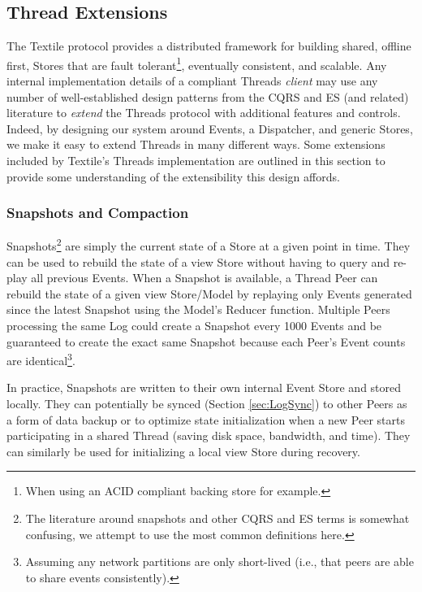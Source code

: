 \documentclass{textile}
\begin{document}
\subsection{Thread Extensions}

The Textile protocol provides a distributed framework for building shared, offline first, Stores that are fault tolerant\footnote{When using an ACID compliant backing store for example.}, eventually consistent, and scalable. Any internal implementation details of a compliant Threads \emph{client} may use any number of well-established design patterns from the CQRS and ES (and related) literature to \emph{extend} the Threads protocol with additional features and controls. Indeed, by designing our system around Events, a Dispatcher, and generic Stores, we make it easy to extend Threads in many different ways. Some extensions included by Textile's Threads implementation are outlined in this section to provide some understanding of the extensibility this design affords.

\subsubsection{Snapshots and Compaction}\label{sec:SnapshotsCompaction}

Snapshots\footnote{The literature around snapshots and other CQRS and ES terms is somewhat confusing, we attempt to use the most common definitions here.} are simply the current state of a Store at a given point in time. They can be used to rebuild the state of a view Store without having to query and re-play all previous Events. When a Snapshot is available, a Thread Peer can rebuild the state of a given view Store/Model by replaying only Events generated since the latest Snapshot using the Model's Reducer function. Multiple Peers processing the same Log could create a Snapshot every 1000 Events and be guaranteed to create the exact same Snapshot because each Peer's Event counts are identical\footnote{Assuming any network partitions are only short-lived (i.e., that peers are able to share events consistently).}. 

In practice, Snapshots are written to their own internal Event Store and stored locally. They can potentially be synced (Section \ref{sec:LogSync}) to other Peers as a form of data backup or to optimize state initialization when a new Peer starts participating in a shared Thread (saving disk space, bandwidth, and time). They can similarly be used for initializing a local view Store during recovery.
\end{document}

